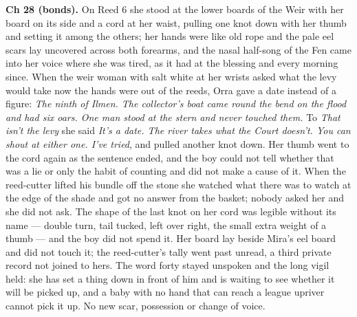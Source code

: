 \documentclass{design/chronicle}
\begin{document}
{\textbf{Ch 28 (bonds).} On Reed 6 she stood at the lower boards of the Weir with her board on its side and a cord at her waist, pulling one knot down with her thumb and setting it among the others; her hands were like old rope and the pale eel scars lay uncovered across both forearms, and the nasal half-song of the Fen came into her voice where she was tired, as it had at the blessing and every morning since. When the weir woman with salt white at her wrists asked what the levy would take now the hands were out of the reeds, Orra gave a date instead of a figure: \emph{The ninth of Ilmen. The collector’s boat came round the bend on the flood and had six oars. One man stood at the stern and never touched them.} To \emph{That isn’t the levy} she said \emph{It’s a date. The river takes what the Court doesn’t. You can shout at either one. I’ve tried}, and pulled another knot down. Her thumb went to the cord again as the sentence ended, and the boy could not tell whether that was a lie or only the habit of counting and did not make a cause of it. When the reed-cutter lifted his bundle off the stone she watched what there was to watch at the edge of the shade and got no answer from the basket; nobody asked her and she did not ask. The shape of the last knot on her cord was legible without its name — double turn, tail tucked, left over right, the small extra weight of a thumb — and the boy did not spend it. Her board lay beside Mira’s eel board and did not touch it; the reed-cutter’s tally went past unread, a third private record not joined to hers. The word forty stayed unspoken and the long vigil held: she has set a thing down in front of him and is waiting to see whether it will be picked up, and a baby with no hand that can reach a league upriver cannot pick it up. No new scar, possession or change of voice.

}
\end{document}
